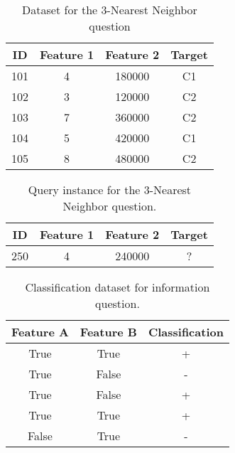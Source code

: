 \documentclass[nosolution]{ditpaper}
\begin{document}
\newpage

\begin{table}[htdp]
\caption{Dataset for the 3-Nearest Neighbor question}
\begin{center}
\begin{tabular}{cccc}
\hline
ID & Feature 1 & Feature 2  & Target \\
\hline
101 & 4 &	180000 & C1\\
102 & 3 &	120000 & C2\\
103 & 7 &	360000 & C2\\
104 & 5 &	420000 &	C1\\
105 & 8 &	480000 &	C2\\
\hline
\end{tabular}
\end{center}
\label{tab:3nn-data}
\end{table}%

\begin{table}[htdp]
\caption{Query instance for the 3-Nearest Neighbor question.}
\begin{center}
\begin{tabular}{cccc}
\hline
ID & Feature 1 & Feature 2  & Target \\
\hline
250 & 4 &	240000 & ?\\
\hline
\end{tabular}
\end{center}
\label{tab:3nn-query}
\end{table}%


			\begin{table}[htb]
			\caption{Classification dataset for information question.}
			\label{tab:classification-data}
			\begin{center}
			\begin{tabular}{ccc}
				\hline
				Feature A & Feature B & Classification \\
				\hline
				True & True & + \\
				True & False & - \\
				True & False & + \\
				True & True & + \\
				False & True & - \\
				\hline
			\end{tabular}
			\end{center}
		\end{table}

\clearpage



\end{document}
